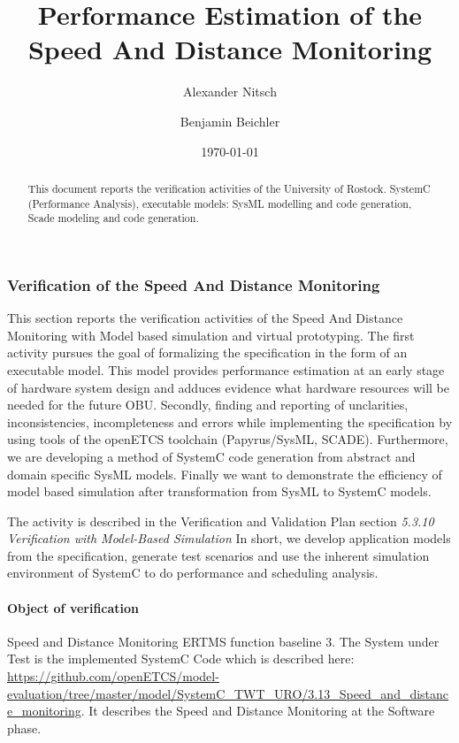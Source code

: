 \documentclass{article}
\title{Performance Estimation of the Speed And Distance Monitoring}
\author{Alexander Nitsch \and Benjamin Beichler}
\date{\today}
\newcommand{\nl}{\mbox{}\\}
\begin{document}
\maketitle
\begin{abstract}
  This document reports the verification activities of the University of Rostock. SystemC (Performance Analysis), executable models: SysML modelling and code generation, Scade modeling and code generation.
\end{abstract}


\subsubsection{Verification of the  Speed And Distance Monitoring}

This section reports the verification activities of the Speed And Distance Monitoring with Model based simulation and virtual prototyping. The first activity pursues the goal of formalizing the specification in the form of an executable model. This model provides performance estimation at an early stage of hardware system design and adduces evidence what hardware resources will be needed for the future OBU. Secondly, finding and reporting of unclarities, inconsistencies, incompleteness and errors while implementing the specification by using tools of the openETCS toolchain (Papyrus/SysML, SCADE). Furthermore, we are developing a method of SystemC code generation from abstract and domain specific SysML models. Finally we want to demonstrate the efficiency of model based simulation after transformation from SysML to SystemC models.

The activity is described in the Verification and Validation Plan
section {\em 5.3.10 Verification with Model-Based Simulation} \cite{???}
In short, we develop application models from the specification, generate test scenarios and use the inherent simulation environment of SystemC to do performance and scheduling analysis.

\paragraph{Object of verification}  Speed and Distance Monitoring ERTMS function baseline 3.
The System under Test is the implemented SystemC Code which is described  here: \url{https://github.com/openETCS/model-evaluation/tree/master/model/SystemC_TWT_URO/3.13_Speed_and_distance_monitoring}. It describes the Speed and Distance Monitoring at the Software phase.
\nl
\end{document}
